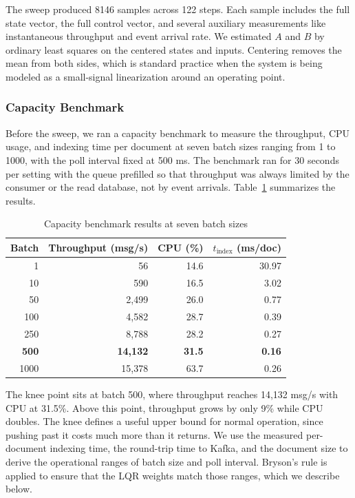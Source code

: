 \documentclass[10pt,a4paper]{article}
\begin{document}
The sweep produced 8146 samples across 122 steps. Each sample includes the full state vector, the full control vector, and several auxiliary measurements like instantaneous throughput and event arrival rate. We estimated $A$ and $B$ by ordinary least squares on the centered states and inputs. Centering removes the mean from both sides, which is standard practice when the system is being modeled as a small-signal linearization around an operating point.

\subsubsection{Capacity Benchmark}

Before the sweep, we ran a capacity benchmark to measure the throughput, CPU usage, and indexing time per document at seven batch sizes ranging from 1 to 1000, with the poll interval fixed at 500 ms. The benchmark ran for 30 seconds per setting with the queue prefilled so that throughput was always limited by the consumer or the read database, not by event arrivals. Table~\ref{tab:capacity} summarizes the results.

\begin{table}[H]
\centering
\caption{Capacity benchmark results at seven batch sizes}
\label{tab:capacity}
\begin{tabular}{rrrr}
\toprule
\textbf{Batch} & \textbf{Throughput (msg/s)} & \textbf{CPU (\%)} & \textbf{$t_{\mathrm{index}}$ (ms/doc)} \\
\midrule
1     & 56     & 14.6 & 30.97 \\
10    & 590    & 16.5 & 3.02  \\
50    & 2{,}499  & 26.0 & 0.77  \\
100   & 4{,}582  & 28.7 & 0.39  \\
250   & 8{,}788  & 28.2 & 0.27  \\
\textbf{500}   & \textbf{14{,}132} & \textbf{31.5} & \textbf{0.16} \\
1000  & 15{,}378 & 63.7 & 0.26  \\
\bottomrule
\end{tabular}
\end{table}

The knee point sits at batch 500, where throughput reaches 14{,}132 msg/s with CPU at 31.5\%. Above this point, throughput grows by only 9\% while CPU doubles. The knee defines a useful upper bound for normal operation, since pushing past it costs much more than it returns. We use the measured per-document indexing time, the round-trip time to Kafka, and the document size to derive the operational ranges of batch size and poll interval. Bryson's rule is applied to ensure that the LQR weights match those ranges, which we describe below.
\end{document}
